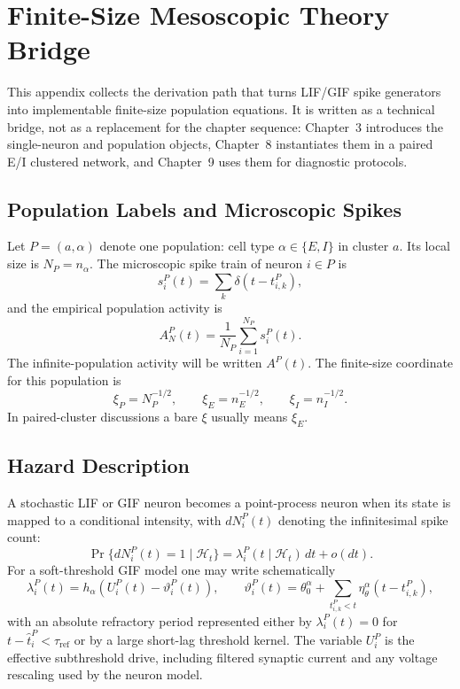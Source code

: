 \chapter{Finite-Size Mesoscopic Theory Bridge}
\label{app:finite-size-mesoscopic-theory}

This appendix collects the derivation path that turns LIF/GIF spike generators
into implementable finite-size population equations. It is written as a
technical bridge, not as a replacement for the chapter sequence: Chapter~3
introduces the single-neuron and population objects, Chapter~8 instantiates
them in a paired E/I clustered network, and Chapter~9 uses them for diagnostic
protocols.

\section{Population Labels and Microscopic Spikes}

Let \(P=(a,\alpha)\) denote one population: cell type
\(\alpha\in\{E,I\}\) in cluster \(a\). Its local size is
\(N_P=n_\alpha\). The microscopic spike train of neuron \(i\in P\) is
\begin{equation}
  s_i^P(t)=\sum_k \delta(t-t_{i,k}^P),
  \label{eq:appA-spike-train}
\end{equation}
and the empirical population activity is
\begin{equation}
  A_N^P(t)
  =
  \frac{1}{N_P}\sum_{i=1}^{N_P}s_i^P(t).
  \label{eq:appA-empirical-activity}
\end{equation}
The infinite-population activity will be written \(A^P(t)\). The finite-size
coordinate for this population is
\begin{equation}
  \xi_P=N_P^{-1/2},
  \qquad
  \xi_E=n_E^{-1/2},
  \qquad
  \xi_I=n_I^{-1/2}.
  \label{eq:appA-xi}
\end{equation}
In paired-cluster discussions a bare \(\xi\) usually means \(\xi_E\).

\section{Hazard Description}

A stochastic LIF or GIF neuron becomes a point-process neuron when its state is
mapped to a conditional intensity, with \(dN_i^P(t)\) denoting the infinitesimal
spike count:
\begin{equation}
  \Pr\{dN_i^P(t)=1\mid\mathcal H_t\}
  =
  \lambda_i^P(t\mid\mathcal H_t)\,dt+o(dt).
  \label{eq:appA-hazard-definition}
\end{equation}
For a soft-threshold GIF model one may write schematically
\begin{equation}
  \lambda_i^P(t)
  =
  h_\alpha\!\left(
    U_i^P(t)-\vartheta_i^P(t)
  \right),
  \qquad
  \vartheta_i^P(t)
  =
  \theta_0^\alpha+\sum_{t_{i,k}^P<t}
  \eta_\theta^\alpha(t-t_{i,k}^P),
  \label{eq:appA-gif-hazard}
\end{equation}
with an absolute refractory period represented either by
\(\lambda_i^P(t)=0\) for \(t-\hat t_i^P<\tau_{\mathrm{ref}}\) or by a large
short-lag threshold kernel. The variable \(U_i^P\) is the effective
subthreshold drive, including filtered synaptic current and any voltage
rescaling used by the neuron model.

